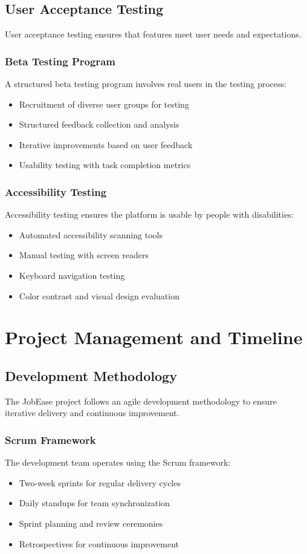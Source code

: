 \documentclass[12pt,a4paper]{report}
\begin{document}
\section{User Acceptance Testing}
User acceptance testing ensures that features meet user needs and expectations.

\subsection{Beta Testing Program}
A structured beta testing program involves real users in the testing process:
\begin{itemize}[leftmargin=2em]
  \item Recruitment of diverse user groups for testing
  \item Structured feedback collection and analysis
  \item Iterative improvements based on user feedback
  \item Usability testing with task completion metrics
\end{itemize}

\subsection{Accessibility Testing}
Accessibility testing ensures the platform is usable by people with disabilities:
\begin{itemize}[leftmargin=2em]
  \item Automated accessibility scanning tools
  \item Manual testing with screen readers
  \item Keyboard navigation testing
  \item Color contrast and visual design evaluation
\end{itemize}

\chapter{Project Management and Timeline}

\section{Development Methodology}
The JobEase project follows an agile development methodology to ensure iterative delivery and continuous improvement.

\subsection{Scrum Framework}
The development team operates using the Scrum framework:
\begin{itemize}[leftmargin=2em]
  \item Two-week sprints for regular delivery cycles
  \item Daily standups for team synchronization
  \item Sprint planning and review ceremonies
  \item Retrospectives for continuous improvement
\end{itemize}
\end{document}
